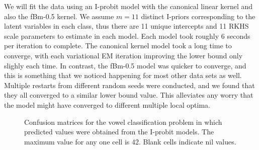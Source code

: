 \documentclass[a4paper,showframe,11pt]{report}\usepackage[]{graphicx}\usepackage[]{color}
\newenvironment{knitrout}{}{} %
\begin{document}
We will fit the data using an I-probit model with the canonical linear kernel and also the fBm-0.5 kernel.
We assume $m = 11$ distinct I-priors corresponding to the latent variables in each class, thus there are 11 unique intercepts and 11 RKHS scale parameters to estimate in each model.
Each model took roughly 6 seconds per iteration to complete.
The canonical kernel model took a long time to converge, with each variational EM iteration improving the lower bound only slighly each time.
In contrast, the fBm-0.5 model was quicker to converge, and this is something that we noticed happening for most other data sets as well.
Multiple restarts from different random seeds were conducted, and we found that they all converged to a similar lower bound value.
This alleviates any worry that the model might have converged to different multiple local optima.

\begin{knitrout}
\color{fgcolor}\begin{figure}[h]

{\centering {}

}

\caption[Confusion matrices for the vowel classification problem in which predicted values were obtained from the I-probit models]{Confusion matrices for the vowel classification problem in which predicted values were obtained from the I-probit models. The maximum value for any one cell is 42. Blank cells indicate nil values.}\label{fig:vowel.confusion.matrix}
\end{figure}


\end{knitrout}
\end{document}
